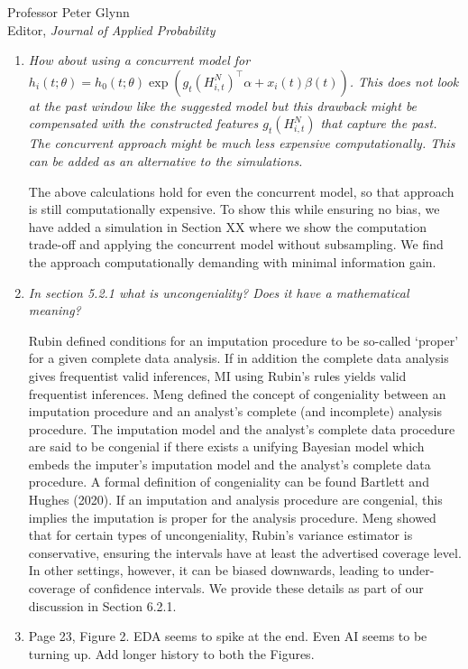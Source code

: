 \documentclass[11pt]{letter} %
\begin{document}
\begin{letter}{Professor
	Peter Glynn\\
	Editor, {\em Journal of Applied Probability}}
\begin{enumerate}
\vspace{5mm}

\item {\it How about using a concurrent model for $h_i (t;\theta) = h_0 (t; \theta) \exp (g_t (H_{i,t}^N)^\top \alpha + x_i (t) \beta (t))$. This does not look at the past window like the suggested model but this drawback might be compensated with the constructed features $g_t (H_{i,t}^N)$ that capture the past. The concurrent approach might be much less expensive computationally. This can be added as an alternative to the simulations.}

\vspace{5mm}
The above calculations hold for even the concurrent model, so that approach is still computationally expensive.  To show this while ensuring no bias, we have added a simulation in Section XX where we show the computation trade-off and applying the concurrent model without subsampling.  We find the approach computationally demanding with minimal information gain.
\vspace{5mm}

\item {\it In section 5.2.1 what is uncongeniality? Does it have a mathematical
meaning?}

\vspace{5mm}
Rubin defined conditions for an imputation procedure to be so-called ‘proper’ for a given complete data analysis. If in addition the complete data analysis gives frequentist valid inferences, MI using Rubin’s rules yields valid frequentist inferences. Meng defined the concept of congeniality between an imputation procedure and an analyst’s complete (and incomplete) analysis procedure. The imputation model and the analyst’s complete data procedure are said to be congenial if there exists a unifying Bayesian model which embeds the imputer’s imputation model and the analyst’s complete data procedure.  A formal definition of congeniality can be found Bartlett and Hughes (2020).  If an imputation and analysis procedure are congenial, this implies the imputation is proper for the analysis procedure. Meng showed that for certain types of uncongeniality, Rubin’s variance estimator is conservative, ensuring the intervals have at least the advertised coverage level. In other settings, however, it can be biased downwards, leading to under-coverage of confidence intervals.  We provide these details as part of our discussion in Section 6.2.1.
\vspace{5mm}

\item Page 23, Figure 2. EDA seems to spike at the end. Even AI seems to be
turning up. Add longer history to both the Figures.
\vspace{5mm}


\end{enumerate}
\end{letter}
\end{document}
